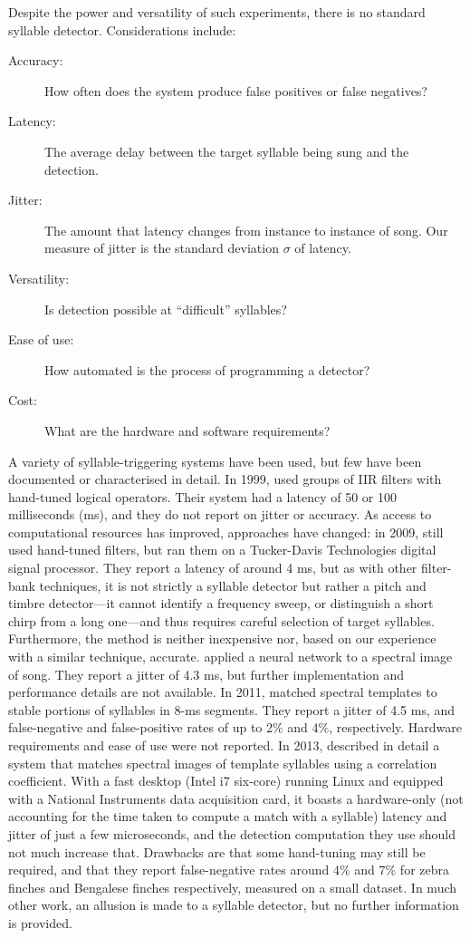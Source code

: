 \documentclass[10pt,letterpaper]{article}
\begin{document}
Despite the power and versatility of such experiments, there is no standard syllable detector.  Considerations include:
\begin{description}
\item[Accuracy:] How often does the system produce false positives or false negatives?
\item[Latency:] The average delay between the target syllable being sung and the detection.
\item[Jitter:] The amount that latency changes from instance to instance of song.  Our measure of jitter is the standard deviation $\sigma$ of latency.
\item[Versatility:] Is detection possible at ``difficult'' syllables?
\item[Ease of use:] How automated is the process of programming a detector?
\item[Cost:] What are the hardware and software requirements?
\end{description}

A variety of syllable-triggering systems have been used, but few have
been documented or characterised in detail.  In 1999,
\cite{Leonardo1999} used groups of IIR filters with hand-tuned logical
operators.  Their system had a latency of 50 or 100 milliseconds (ms),
and they do not report on jitter or accuracy.  As access to
computational resources has improved, approaches have changed: in
2009, \cite{Andalman2009} still used hand-tuned filters, but ran them
on a Tucker-Davis Technologies digital signal processor.  They report
a latency of around 4 ms, but as with other filter-bank techniques, it
is not strictly a syllable detector but rather a pitch and timbre
detector---it cannot identify a frequency sweep, or distinguish a
short chirp from a long one---and thus requires careful selection of
target syllables.  Furthermore, the method is neither inexpensive nor,
based on our experience with a similar technique, accurate.
\cite{Keller2009} applied a neural network to a spectral image of
song.  They report a jitter of 4.3 ms, but further implementation and
performance details are not available.  In 2011, \cite{Warren2011}
matched spectral templates to stable portions of syllables in 8-ms
segments.  They report a jitter of 4.5 ms, and false-negative and
false-positive rates of up to 2\% and 4\%, respectively.  Hardware
requirements and ease of use were not reported.  In 2013,
\cite{Skocik2013} described in detail a system that matches spectral
images of template syllables using a correlation coefficient.  With a
fast desktop (Intel i7 six-core) running Linux and equipped with a
National Instruments data acquisition card, it boasts a hardware-only
(not accounting for the time taken to compute a match with a syllable)
latency and jitter of just a few microseconds, and the detection
computation they use should not much increase that.  Drawbacks are
that some hand-tuning may still be required, and that they report
false-negative rates around 4\% and 7\% for zebra finches and
Bengalese finches respectively, measured on a small dataset.  In much
other work, an allusion is made to a syllable detector, but no further
information is provided.
\end{document}
